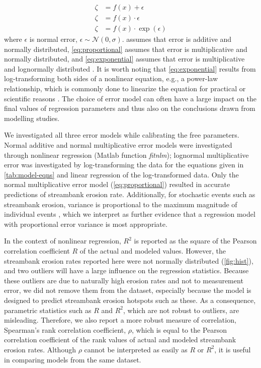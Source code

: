\documentclass[preprint, review, authoryear, 12pt]{elsarticle}
\begin{document}
\begin{align}
\zeta &= f(x) + \epsilon \label{eq:constant} \\
\zeta &= f(x) \cdot \epsilon \label{eq:proportional} \\
\zeta &= f(x) \cdot \exp(\epsilon) \label{eq:exponential}
\end{align}
where $\epsilon$ is normal error, $\epsilon \sim \mathcal{N}(0, \sigma)$.  assumes that error is additive and normally distributed, \cref{eq:proportional} assumes that error is multiplicative and normally distributed, and \cref{eq:exponential} assumes that error is multiplicative and lognormally distributed \citep{Xiao2011}. It is worth noting that \cref{eq:exponential} results from log-transforming both sides of a nonlinear equation, e.g., a power-law relationship, which is commonly done to linearize the equation for practical or scientific reasons \citep{Xiao2011}. The choice of error model can often have a large impact on the final values of regression parameters and thus also on the conclusions drawn from modelling studies.

We investigated all three error models while calibrating the free parameters. Normal additive and normal multiplicative error models were investigated through nonlinear regression (Matlab function \emph{fitnlm}); lognormal multiplicative error was investigated by log-transforming the data for the equations given in \cref{tab:model-eqns} and linear regression of the log-transformed data. Only the normal multiplicative error model (\cref{eq:proportional}) resulted in accurate predictions of streambank erosion rate. Additionally, for stochastic events such as streambank erosion, variance is proportional to the maximum magnitude of individual events \citep{Pizzuto2010}, which we interpret as further evidence that a regression model with proportional error variance is most appropriate.

In the context of nonlinear regression, $R^2$ is reported as the square of the Pearson correlation coefficient $R$ of the actual and modeled values. However, the streambank erosion rates reported here were not normally distributed (\cref{fig:hist}), and two outliers will have a large influence on the regression statistics. Because these outliers are due to naturally high erosion rates and not to measurement error, we did not remove them from the dataset, especially because the model is designed to predict streambank erosion hotspots such as these. As a consequence, parametric statistics such as $R$ and $R^2$, which are not robust to outliers, are misleading. Therefore, we also report a more robust measure of correlation, Spearman's rank correlation coefficient, $\rho$, which is equal to the Pearson correlation coefficient of the rank values of actual and modeled streambank erosion rates. Although $\rho$ cannot be interpreted as easily as $R$ or $R^2$, it is useful in comparing models from the same dataset.
\end{document}
